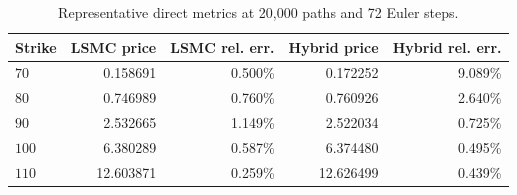 \begin{table}[htbp]
\centering
\caption{Representative direct metrics at 20,000 paths and 72 Euler steps.}
\label{tab:bgk_r03_v004_t1_delta05_nex12-step72-20k}
\begin{tabular}{lrrrr}
\toprule
Strike & LSMC price & LSMC rel. err. & Hybrid price & Hybrid rel. err. \\
\midrule
$70$ & 0.158691 & 0.500\% & 0.172252 & 9.089\% \\
$80$ & 0.746989 & 0.760\% & 0.760926 & 2.640\% \\
$90$ & 2.532665 & 1.149\% & 2.522034 & 0.725\% \\
$100$ & 6.380289 & 0.587\% & 6.374480 & 0.495\% \\
$110$ & 12.603871 & 0.259\% & 12.626499 & 0.439\% \\
\bottomrule
\end{tabular}
\end{table}
